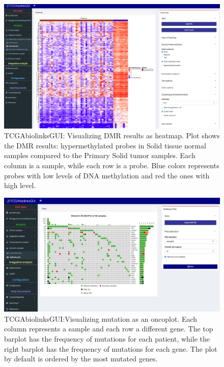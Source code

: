 \begin{figure}
\includegraphics[width=1.0\linewidth]{images/gui_heatmap.png}
\caption[TCGAbiolinksGUI: Visualizing DMR results as heatmap]{TCGAbiolinksGUI: Visualizing DMR results as heatmap. Plot shows the DMR results: hypermethylated probes in Solid tissue normal samples compared to the Primary Solid tumor samples. Each column is a sample, while each row is a probe. Blue colors represents probes with low levels of DNA methylation and red the ones with high level. }
\label{fig:gui_heatmap}
\end{figure}


\begin{figure}
\includegraphics[width=1.0\linewidth]{images/maftools_oncoplot.png}
\caption[TCGAbiolinksGUI: Visualizing mutation as an oncoplot]{TCGAbiolinksGUI:Visualizing mutation as an oncoplot. Each column
represents a sample and each row a different gene. The top barplot has the frequency of mutations for each patient, while
the right barplot has the frequency of mutations for each gene. The plot by default is ordered by the most mutated genes.}
\label{fig:maftoools_oncoplot}
\end{figure}


